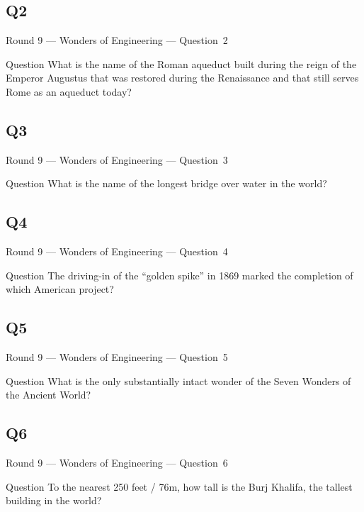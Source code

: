 \documentclass[11pt]{beamer}
\begin{document}
\subsection*{Q2}
\begin{frame}[t]{Round 9 --- Wonders of Engineering --- \mbox{Question 2}}
\vspace{-0.5em}
\begin{block}{Question}
What is the name of the Roman aqueduct built during the reign of the Emperor Augustus that was restored during the Renaissance and that still serves Rome as an aqueduct today?
\end{block}
\end{frame}
\subsection*{Q3}
\begin{frame}[t]{Round 9 --- Wonders of Engineering --- \mbox{Question 3}}
\vspace{-0.5em}
\begin{block}{Question}
What is the name of the longest bridge over water in the world?
\end{block}
\end{frame}
\subsection*{Q4}
\begin{frame}[t]{Round 9 --- Wonders of Engineering --- \mbox{Question 4}}
\vspace{-0.5em}
\begin{block}{Question}
The driving-in of the ``golden spike'' in 1869 marked the completion of which American project?
\end{block}
\end{frame}
\subsection*{Q5}
\begin{frame}[t]{Round 9 --- Wonders of Engineering --- \mbox{Question 5}}
\vspace{-0.5em}
\begin{block}{Question}
What is the only substantially intact wonder of the Seven Wonders of the Ancient World?
\end{block}
\end{frame}
\subsection*{Q6}
\begin{frame}[t]{Round 9 --- Wonders of Engineering --- \mbox{Question 6}}
\vspace{-0.5em}
\begin{block}{Question}
To the nearest 250 feet / 76m, how tall is the Burj Khalifa, the tallest building in the world?
\end{block}
\end{frame}
\end{document}

